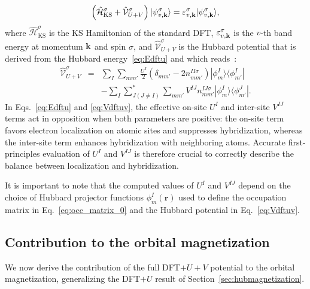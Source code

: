 \documentclass[11pt]{article}
\begin{document}
%
\begin{equation}
     \left(\hat{\mathcal H}_\mathrm{KS}^\sigma +
     \hat{\mathcal V}_{U+V}^\sigma \right)|\psi_{v,{\bf k}}^\sigma\rangle
     = \varepsilon_{v,{\bf k}}^\sigma |\psi_{v,{\bf k}}^\sigma\rangle,
\end{equation}
%
where $\hat{\mathcal H}_\mathrm{KS}^\sigma$ is the KS Hamiltonian of the standard DFT, $\varepsilon_{v,{\bf k}}^\sigma$ is the $v$-th band energy at momentum ${\bf k}$ and spin $\sigma$, and $\hat{\mathcal V}_{U+V}^\sigma$ is the Hubbard potential that is derived from the Hubbard energy~\eqref{eq:Edftu} and which reads~\cite{Timrov:2021}:
%
\begin{eqnarray} 
\hat{\mathcal V}_{U+V}^\sigma & = &
    \sum_{I}\sum_{mm'}\frac{U^I}{2}
    \left(
    \delta_{mm'}-2n^{II\sigma}_{mm'}
    \right) 
    |\phi^I_m\rangle
    \langle\phi^I_{m'}| \nonumber \\
    & & - \sum_{I} \sum_{J (J \ne I)}^{*}\sum_{mm'} V^{IJ} n^{IJ\sigma}_{mm'}
    |\phi^I_m\rangle
    \langle \phi^J_{m'}|.
    \label{eq:Vdftuv}
\end{eqnarray}
%
In Eqs.~\eqref{eq:Edftu} and \eqref{eq:Vdftuv}, the effective on-site $U^I$ and inter-site $V^{IJ}$ terms act in opposition when both parameters are positive: the on-site term favors electron localization on atomic sites and suppresses hybridization, whereas the inter-site term enhances hybridization with neighboring atoms. Accurate first-principles evaluation of $U^I$ and $V^{IJ}$ is therefore crucial to correctly describe the balance between localization and hybridization. 

It is important to note that the computed values of $U^I$ and $V^{IJ}$ depend on the choice of Hubbard projector functions $\phi^I_{m}(\mathbf{r})$ used to define the occupation matrix in Eq.~\eqref{eq:occ_matrix_0} and the Hubbard potential in Eq.~\eqref{eq:Vdftuv}.

\subsection{Contribution to the orbital magnetization}

We now derive the contribution of the full DFT$+U+V$ potential to the orbital
magnetization, generalizing the DFT$+U$ result of
Section~\ref{sec:hubmagnetization}.
\end{document}
